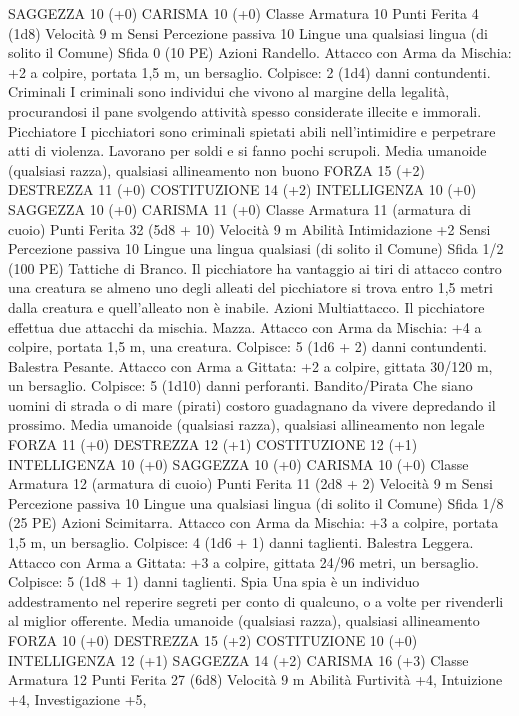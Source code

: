 \begin{multicols}{2}
SAGGEZZA 10 (+0)
CARISMA 10 (+0)
Classe Armatura 10
Punti Ferita 4 (1d8)
Velocità 9 m
Sensi Percezione passiva 10
Lingue una qualsiasi lingua (di solito il Comune)
Sfida 0 (10 PE)
Azioni
Randello. Attacco con Arma da Mischia: +2 a colpire, portata
1,5 m, un bersaglio.
Colpisce: 2 (1d4) danni contundenti.
Criminali
I criminali sono individui che vivono al margine della
legalità, procurandosi il pane svolgendo attività spesso
considerate illecite e immorali.
Picchiatore
I picchiatori sono criminali spietati abili nell’intimidire e
perpetrare atti di violenza. Lavorano per soldi e si fanno
pochi scrupoli.
Media umanoide (qualsiasi razza), qualsiasi allineamento non
buono
FORZA 15 (+2)
DESTREZZA 11 (+0)
COSTITUZIONE 14 (+2)
INTELLIGENZA 10 (+0)
SAGGEZZA 10 (+0)
CARISMA 11 (+0)
Classe Armatura 11 (armatura di cuoio)
Punti Ferita 32 (5d8 + 10)
Velocità 9 m
Abilità Intimidazione +2
Sensi Percezione passiva 10
Lingue una lingua qualsiasi (di solito il Comune)
Sfida 1/2 (100 PE)
Tattiche di Branco. Il picchiatore ha vantaggio ai tiri di attacco
contro una creatura se almeno uno degli alleati del picchiatore si
trova entro 1,5 metri dalla creatura e quell’alleato non è inabile.
Azioni
Multiattacco. Il picchiatore effettua due attacchi da mischia.
Mazza. Attacco con Arma da Mischia: +4 a colpire, portata 1,5
m, una creatura.
Colpisce: 5 (1d6 + 2) danni contundenti.
Balestra Pesante. Attacco con Arma a Gittata: +2 a colpire,
gittata 30/120 m, un bersaglio.
Colpisce: 5 (1d10) danni perforanti.
Bandito/Pirata
Che siano uomini di strada o di mare (pirati) costoro
guadagnano da vivere depredando il prossimo.
Media umanoide (qualsiasi razza), qualsiasi allineamento non
legale
FORZA 11 (+0)
DESTREZZA 12 (+1)
COSTITUZIONE 12 (+1)
INTELLIGENZA 10 (+0)
SAGGEZZA 10 (+0)
CARISMA 10 (+0)
Classe Armatura 12 (armatura di cuoio)
Punti Ferita 11 (2d8 + 2)
Velocità 9 m
Sensi Percezione passiva 10
Lingue una qualsiasi lingua (di solito il Comune)
Sfida 1/8 (25 PE)
Azioni
Scimitarra. Attacco con Arma da Mischia: +3 a colpire, portata
1,5 m, un bersaglio.
Colpisce: 4 (1d6 + 1) danni taglienti.
Balestra Leggera. Attacco con Arma a Gittata: +3 a colpire,
gittata 24/96 metri, un bersaglio.
Colpisce: 5 (1d8 + 1) danni taglienti.
Spia
Una spia è un individuo addestramento nel reperire
segreti per conto di qualcuno, o a volte per rivenderli al
miglior offerente.
Media umanoide (qualsiasi razza), qualsiasi allineamento
FORZA 10 (+0)
DESTREZZA 15 (+2)
COSTITUZIONE 10 (+0)
INTELLIGENZA 12 (+1)
SAGGEZZA 14 (+2)
CARISMA 16 (+3)
Classe Armatura 12
Punti Ferita 27 (6d8)
Velocità 9 m
Abilità Furtività +4, Intuizione +4, Investigazione +5,

\end{multicols}
